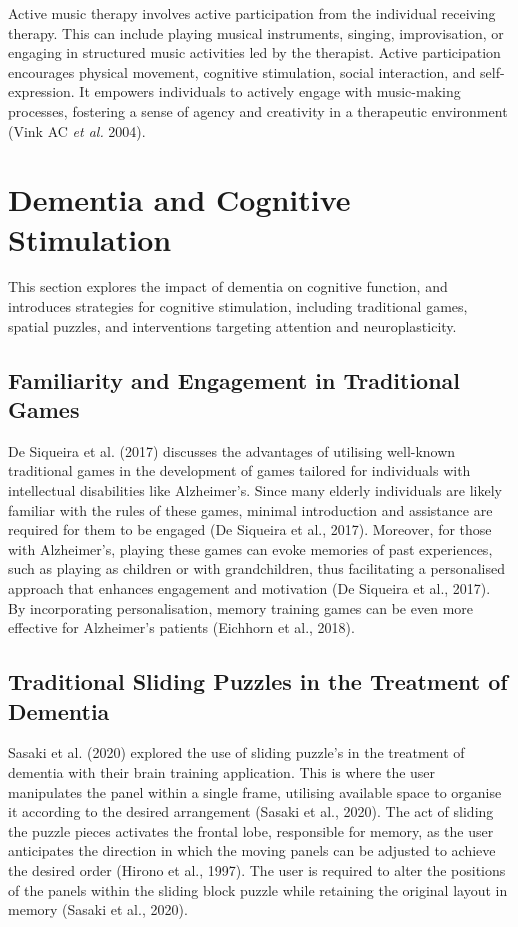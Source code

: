 \documentclass{l4proj}
\begin{document}
Active music therapy involves active participation from the individual receiving therapy. This can include playing musical instruments, singing, improvisation, or engaging in structured music activities led by the therapist. Active participation encourages physical movement, cognitive stimulation, social interaction, and self-expression. It empowers individuals to actively engage with music-making processes, fostering a sense of agency and creativity in a therapeutic environment (Vink AC \emph{et al.} 2004).


\section{Dementia and Cognitive Stimulation}
This section explores the impact of dementia on cognitive function, and introduces strategies for cognitive stimulation, including traditional games, spatial puzzles, and interventions targeting attention and neuroplasticity.

\subsection{Familiarity and Engagement in Traditional Games}\label{sec:traditional_games}
De Siqueira et al. (2017) discusses the advantages of utilising well-known traditional games in the development of games tailored for individuals with intellectual disabilities like Alzheimer's. Since many elderly individuals are likely familiar with the rules of these games, minimal introduction and assistance are required for them to be engaged (De Siqueira et al., 2017). Moreover, for those with Alzheimer's, playing these games can evoke memories of past experiences, such as playing as children or with grandchildren, thus facilitating a personalised approach that enhances engagement and motivation (De Siqueira et al., 2017). By incorporating personalisation, memory training games can be even more effective for Alzheimer's patients (Eichhorn et al., 2018).


\subsection{Traditional Sliding Puzzles in the Treatment of Dementia}\label{sec:sliding_dementia}

Sasaki et al. (2020) explored the use of sliding puzzle's in the treatment of dementia with their brain training application. This is where the user manipulates the panel within a single frame, utilising available space to organise it according to the desired arrangement (Sasaki et al., 2020). The act of sliding the puzzle pieces activates the frontal lobe, responsible for memory, as the user anticipates the direction in which the moving panels can be adjusted to achieve the desired order (Hirono et al., 1997). The user is required to alter the positions of the panels within the sliding block puzzle while retaining the original layout in memory (Sasaki et al., 2020).
\end{document}
